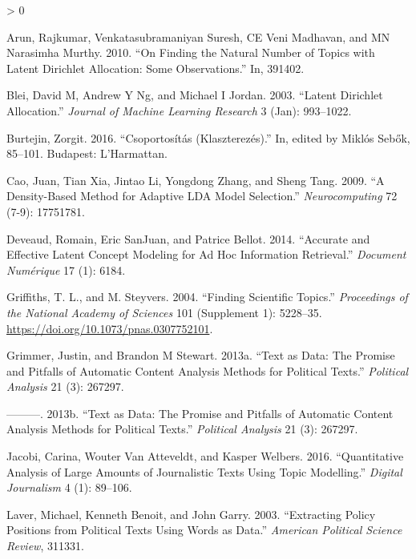 \documentclass[
]{book}
\newlength{\cslhangindent}
\newenvironment{CSLReferences}[2] %
 {%
  \setlength{\parindent}{0pt}
  \ifodd #1 \everypar{\setlength{\hangindent}{\cslhangindent}}\ignorespaces\fi
  \ifnum #2 > 0
  \setlength{\parskip}{#2\baselineskip}
  \fi
 }%
 {}
\begin{document}
\hypertarget{refs}{}
\begin{CSLReferences}{1}{0}
\leavevmode\hypertarget{ref-arun2010finding}{}%
Arun, Rajkumar, Venkatasubramaniyan Suresh, CE Veni Madhavan, and MN
Narasimha Murthy. 2010. {``On Finding the Natural Number of Topics with
Latent Dirichlet Allocation: Some Observations.''} In, 391402.

\leavevmode\hypertarget{ref-blei2003}{}%
Blei, David M, Andrew Y Ng, and Michael I Jordan. 2003. {``Latent
Dirichlet Allocation.''} \emph{Journal of Machine Learning Research} 3
(Jan): 993--1022.

\leavevmode\hypertarget{ref-burtejin2016}{}%
Burtejin, Zorgit. 2016. {``Csoportosítás (Klaszterezés).''} In, edited
by Miklós Sebők, 85--101. Budapest: L'Harmattan.

\leavevmode\hypertarget{ref-cao2009density}{}%
Cao, Juan, Tian Xia, Jintao Li, Yongdong Zhang, and Sheng Tang. 2009.
{``A Density-Based Method for Adaptive LDA Model Selection.''}
\emph{Neurocomputing} 72 (7-9): 17751781.

\leavevmode\hypertarget{ref-deveaud2014accurate}{}%
Deveaud, Romain, Eric SanJuan, and Patrice Bellot. 2014. {``Accurate and
Effective Latent Concept Modeling for Ad Hoc Information Retrieval.''}
\emph{Document Numérique} 17 (1): 6184.

\leavevmode\hypertarget{ref-griffiths2004}{}%
Griffiths, T. L., and M. Steyvers. 2004. {``Finding Scientific
Topics.''} \emph{Proceedings of the National Academy of Sciences} 101
(Supplement 1): 5228--35. \url{https://doi.org/10.1073/pnas.0307752101}.

\leavevmode\hypertarget{ref-grimmer2013text}{}%
Grimmer, Justin, and Brandon M Stewart. 2013a. {``Text as Data: The
Promise and Pitfalls of Automatic Content Analysis Methods for Political
Texts.''} \emph{Political Analysis} 21 (3): 267297.

\leavevmode\hypertarget{ref-grimmer2013texta}{}%
---------. 2013b. {``Text as Data: The Promise and Pitfalls of Automatic
Content Analysis Methods for Political Texts.''} \emph{Political
Analysis} 21 (3): 267297.

\leavevmode\hypertarget{ref-jacobi2016a}{}%
Jacobi, Carina, Wouter Van Atteveldt, and Kasper Welbers. 2016.
{``Quantitative Analysis of Large Amounts of Journalistic Texts Using
Topic Modelling.''} \emph{Digital Journalism} 4 (1): 89--106.

\leavevmode\hypertarget{ref-laver2003extracting}{}%
Laver, Michael, Kenneth Benoit, and John Garry. 2003. {``Extracting
Policy Positions from Political Texts Using Words as Data.''}
\emph{American Political Science Review}, 311331.


\end{CSLReferences}
\end{document}
